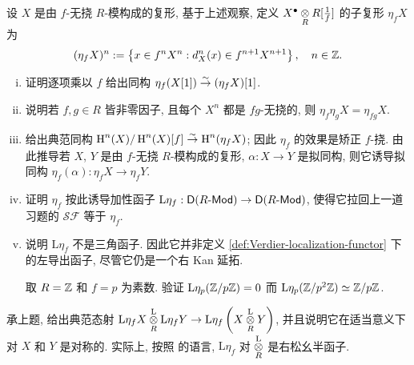 \begin{Exercises}
	设 $X$ 是由 $f$-无挠 $R$-模构成的复形, 基于上述观察, 定义 $X^\bullet \dotimes{R} R[\frac{1}{f}]$ 的子复形 $\eta_f X$ 为
	\[ (\eta_f X)^n := \left\{ x \in f^n X^n : d_X^n(x) \in f^{n+1} X^{n+1} \right\}, \quad n \in \Z . \]
	\begin{enumerate}[(i)]
		\item 证明逐项乘以 $f$ 给出同构 $\eta_f(X[1]) \rightiso (\eta_f X)[1]$.
		\item 说明若 $f, g \in R$ 皆非零因子, 且每个 $X^n$ 都是 $fg$-无挠的, 则 $\eta_f \eta_g X = \eta_{fg} X$.
		\item 给出典范同构 $\Hm^n(X)/\Hm^n(X)[f] \rightiso \Hm^n(\eta_f X)$; 因此 $\eta_f$ 的效果是矫正 $f$-挠. 由此推导若 $X$, $Y$ 是由 $f$-无挠 $R$-模构成的复形, $\alpha: X \to Y$ 是拟同构, 则它诱导拟同构 $\eta_f(\alpha): \eta_f X \to \eta_f Y$.
		\item 证明 $\eta_f$ 按此诱导加性函子 $\mathrm{L}\eta_f: \cate{D}(R\dcate{Mod}) \to \cate{D}(R\dcate{Mod})$, 使得它拉回上一道习题的 $\mathcal{SF}$ 等于 $\eta_f$.
		\item 说明 $\mathrm{L}\eta_f$ 不是三角函子. 因此它并非定义 \ref{def:Verdier-localization-functor} 下的左导出函子, 尽管它仍是一个右 Kan 延拓.

		\begin{hint}
			取 $R = \Z$ 和 $f = p$ 为素数. 验证 $\mathrm{L}\eta_p(\Z/p\Z) = 0$ 而 $\mathrm{L}\eta_p(\Z/p^2\Z) \simeq \Z/p\Z$.
		\end{hint}
	\end{enumerate}

	\item 承上题, 给出典范态射 $\mathrm{L}\eta_f X \otimesL[R] \mathrm{L}\eta_f Y \to \mathrm{L}\eta_f\left( X \otimesL[R] Y \right)$, 并且说明它在适当意义下对 $X$ 和 $Y$ 是对称的. 实际上, 按照 \cite[注记 3.1.8]{Li1} 的语言, $\mathrm{L}\eta_f$ 对 $\otimesL[R]$ 是右松幺半函子.
\end{Exercises}
